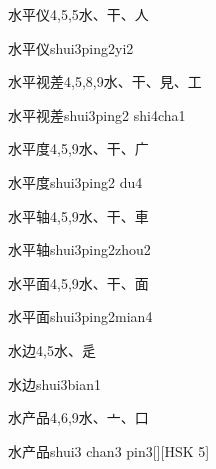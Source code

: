 \begin{entry}{水平仪}{4,5,5}{⽔、⼲、⼈}
  \begin{phonetics}{水平仪}{shui3ping2yi2}
  \end{phonetics}
\end{entry}

\begin{entry}{水平视差}{4,5,8,9}{⽔、⼲、⾒、⼯}
  \begin{phonetics}{水平视差}{shui3ping2 shi4cha1}
  \end{phonetics}
\end{entry}

\begin{entry}{水平度}{4,5,9}{⽔、⼲、⼴}
  \begin{phonetics}{水平度}{shui3ping2 du4}
  \end{phonetics}
\end{entry}

\begin{entry}{水平轴}{4,5,9}{⽔、⼲、⾞}
  \begin{phonetics}{水平轴}{shui3ping2zhou2}
  \end{phonetics}
\end{entry}

\begin{entry}{水平面}{4,5,9}{⽔、⼲、⾯}
  \begin{phonetics}{水平面}{shui3ping2mian4}
  \end{phonetics}
\end{entry}

\begin{entry}{水边}{4,5}{⽔、⾡}
  \begin{phonetics}{水边}{shui3bian1}
  \end{phonetics}
\end{entry}

\begin{entry}{水产品}{4,6,9}{⽔、⼇、⼝}
  \begin{phonetics}{水产品}{shui3 chan3 pin3}[][HSK 5]
  \end{phonetics}
\end{entry}


